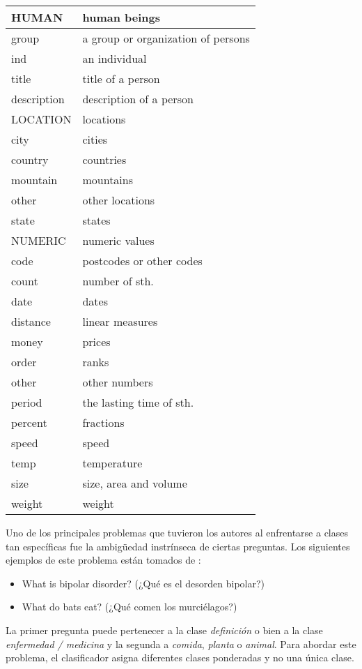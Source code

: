 \begin{center}
\begin{longtable}{| l | l |}
HUMAN & human beings\\ \hline
  group & a group or organization of persons\\ \hline
  ind & an individual\\ \hline
  title & title of a person\\ \hline
  description & description of a person\\ \hline
LOCATION & locations\\ \hline
  city & cities\\ \hline
  country & countries\\ \hline
  mountain & mountains\\ \hline
  other & other locations\\ \hline
  state & states\\ \hline
NUMERIC & numeric values\\ \hline
  code  & postcodes or other codes\\ \hline
  count & number of sth.\\ \hline
  date  & dates\\ \hline
  distance &  linear measures\\ \hline
  money & prices\\ \hline
  order & ranks\\ \hline
  other & other numbers\\ \hline
  period  & the lasting time of sth.\\ \hline
  percent & fractions\\ \hline
  speed & speed\\ \hline
  temp & temperature\\ \hline
  size & size, area and volume\\ \hline
  weight & weight\\ \hline
\end{longtable}
\end{center}


Uno de los principales problemas que tuvieron los autores al enfrentarse a clases tan específicas fue la ambigüedad instrínseca de ciertas preguntas. Los siguientes ejemplos de este problema están tomados de \cite{QC2}:
\begin{itemize}
\item What is bipolar disorder? (¿Qué es el desorden bipolar?)
\item What do bats eat? (¿Qué comen los murciélagos?)
\end{itemize}
La primer pregunta puede pertenecer a la clase \textit{definición} o bien a la clase \textit{enfermedad / medicina} y la segunda a \textit{comida}, \textit{planta} o \textit{animal}. Para abordar este problema, el clasificador asigna diferentes clases ponderadas y no una única clase.

